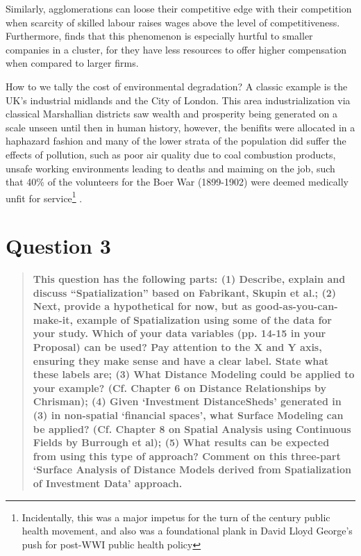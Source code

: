 \documentclass[12pt,letterpaper,notitlepage,onecolumn,final,openbib]{article}
\begin{document}
Similarly, agglomerations can loose their competitive edge with their competition when scarcity of skilled labour raises wages above the level of competitiveness.  Furthermore,  finds that this phenomenon is especially hurtful to smaller companies in a cluster, for they have less resources to offer higher compensation when compared to larger firms.  

How to we tally the cost of environmental degradation?  A classic example is the UK's industrial midlands and the City of London.  This area industrialization via classical Marshallian districts saw wealth and prosperity being generated on a scale unseen until then in human history, however, the benifits were allocated in a haphazard fashion and many of the lower strata of the population did suffer the effects of pollution, such as poor air quality due to coal combustion products, unsafe working environments leading to deaths and maiming on the job, such that 40\% of the volunteers for the Boer War (1899-1902) were deemed medically unfit for service\footnote{Incidentally, this was a major impetus for the turn of the century public health movement, and also was a foundational plank in David Lloyd George's push for post-WWI public health policy\cite{hall2002cities}} \cite{hall2002cities}.  


\section{Question 3}
\begin{quotation}
	\textbf{This question has the following parts: (1) Describe, explain and discuss ``Spatialization'' based on Fabrikant, Skupin et al.; (2) Next, provide a hypothetical for now, but as good-as-you-can-make-it, example of Spatialization using	some of the data for your study. Which of your data variables (pp. 14-15 in your Proposal) can be used? Pay attention to the X and Y axis, ensuring they make sense and have a clear label. State what these labels are; (3) What Distance Modeling could be applied to your example? (Cf. Chapter 6 on Distance Relationships by Chrisman); (4) Given `Investment DistanceSheds' generated in (3) in non-spatial `financial spaces', what Surface Modeling can be applied? (Cf. Chapter 8 on Spatial Analysis using Continuous Fields by Burrough et al); (5) What results can be expected from using this type of approach? Comment on this three-part `Surface Analysis of Distance Models derived from Spatialization of Investment Data' approach.}
\end{quotation}
\end{document}
